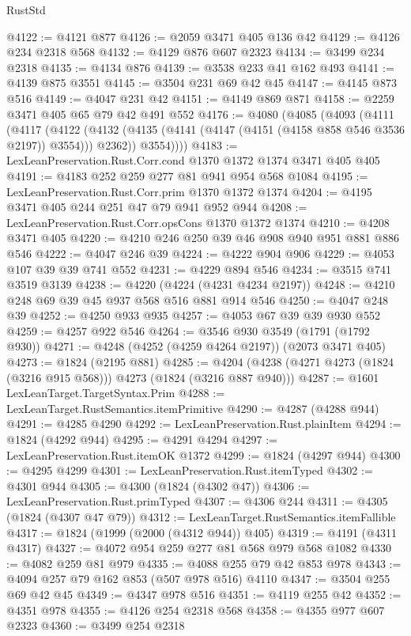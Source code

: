 \begin{lexlean}{RustStd}
\begin{coremodule}
@4122 := @4121 @877
@4126 := @2059 @3471 @405 @136 @42
@4129 := @4126 @234 @2318 @568
@4132 := @4129 @876 @607 @2323
@4134 := @3499 @234 @2318
@4135 := @4134 @876
@4139 := @3538 @233 @41 @162 @493
@4141 := @4139 @875 @3551
@4145 := @3504 @231 @69 @42 @45
@4147 := @4145 @873 @516
@4149 := @4047 @231 @42
@4151 := @4149 @869 @871
@4158 := @2259 @3471 @405 @65 @79 @42 @491 @552
@4176 := @4080
    (@4085
      (@4093
        (@4111
          (@4117
            (@4122
              (@4132 (@4135 (@4141 (@4147 (@4151 (@4158 @858 @546 @3536 @2197)) @3554))) @2362))
            @3554))))
@4183 := LexLeanPreservation.Rust.Corr.cond @1370 @1372 @1374 @3471 @405 @405
@4191 := @4183 @252 @259 @277 @81 @941 @954 @568 @1084
@4195 := LexLeanPreservation.Rust.Corr.prim @1370 @1372 @1374
@4204 := @4195 @3471 @405 @244 @251 @47 @79 @941 @952 @944
@4208 := LexLeanPreservation.Rust.Corr.opsCons @1370 @1372 @1374
@4210 := @4208 @3471 @405
@4220 := @4210 @246 @250 @39 @46 @908 @940 @951 @881 @886 @546
@4222 := @4047 @246 @39
@4224 := @4222 @904 @906
@4229 := @4053 @107 @39 @39 @741 @552
@4231 := @4229 @894 @546
@4234 := @3515 @741 @3519 @3139
@4238 := @4220 (@4224 (@4231 @4234 @2197))
@4248 := @4210 @248 @69 @39 @45 @937 @568 @516 @881 @914 @546
@4250 := @4047 @248 @39
@4252 := @4250 @933 @935
@4257 := @4053 @67 @39 @39 @930 @552
@4259 := @4257 @922 @546
@4264 := @3546 @930 @3549 (@1791 (@1792 @930))
@4271 := @4248 (@4252 (@4259 @4264 @2197)) (@2073 @3471 @405)
@4273 := @1824 (@2195 @881)
@4285 := @4204 (@4238 (@4271 @4273 (@1824 (@3216 @915 @568))) @4273 (@1824 (@3216 @887 @940)))
@4287 := @1601 LexLeanTarget.TargetSyntax.Prim
@4288 := LexLeanTarget.RustSemantics.itemPrimitive
@4290 := @4287 (@4288 @944)
@4291 := @4285 @4290
@4292 := LexLeanPreservation.Rust.plainItem
@4294 := @1824 (@4292 @944)
@4295 := @4291 @4294
@4297 := LexLeanPreservation.Rust.itemOK @1372
@4299 := @1824 (@4297 @944)
@4300 := @4295 @4299
@4301 := LexLeanPreservation.Rust.itemTyped
@4302 := @4301 @944
@4305 := @4300 (@1824 (@4302 @47))
@4306 := LexLeanPreservation.Rust.primTyped
@4307 := @4306 @244
@4311 := @4305 (@1824 (@4307 @47 @79))
@4312 := LexLeanTarget.RustSemantics.itemFallible
@4317 := @1824 (@1999 (@2000 (@4312 @944)) @405)
@4319 := @4191 (@4311 @4317)
@4327 := @4072 @954 @259 @277 @81 @568 @979 @568 @1082
@4330 := @4082 @259 @81 @979
@4335 := @4088 @255 @79 @42 @853 @978
@4343 := @4094 @257 @79 @162 @853 (@507 @978 @516) @4110
@4347 := @3504 @255 @69 @42 @45
@4349 := @4347 @978 @516
@4351 := @4119 @255 @42
@4352 := @4351 @978
@4355 := @4126 @254 @2318 @568
@4358 := @4355 @977 @607 @2323
@4360 := @3499 @254 @2318

\end{coremodule}
\end{lexlean}
